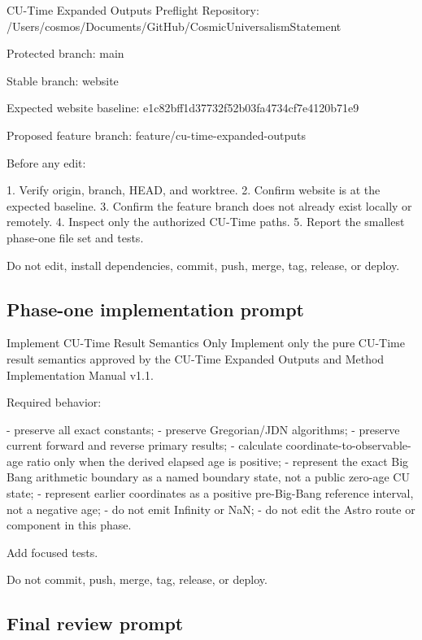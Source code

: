 \documentclass[11pt,letterpaper]{article}
\begin{document}
\begin{promptbox}{CU-Time Expanded Outputs Preflight}
Repository:
/Users/cosmos/Documents/GitHub/CosmicUniversalismStatement

Protected branch:
main

Stable branch:
website

Expected website baseline:
e1c82bff1d37732f52b03fa4734cf7e4120b71e9

Proposed feature branch:
feature/cu-time-expanded-outputs

Before any edit:

1. Verify origin, branch, HEAD, and worktree.
2. Confirm website is at the expected baseline.
3. Confirm the feature branch does not already exist locally or remotely.
4. Inspect only the authorized CU-Time paths.
5. Report the smallest phase-one file set and tests.

Do not edit, install dependencies, commit, push, merge, tag, release,
or deploy.
\end{promptbox}

\subsection{Phase-one implementation prompt}

\begin{promptbox}{Implement CU-Time Result Semantics Only}
Implement only the pure CU-Time result semantics approved by the
CU-Time Expanded Outputs and Method Implementation Manual v1.1.

Required behavior:

- preserve all exact constants;
- preserve Gregorian/JDN algorithms;
- preserve current forward and reverse primary results;
- calculate coordinate-to-observable-age ratio only when the derived
  elapsed age is positive;
- represent the exact Big Bang arithmetic boundary as a named boundary
  state, not a public zero-age CU state;
- represent earlier coordinates as a positive pre-Big-Bang reference
  interval, not a negative age;
- do not emit Infinity or NaN;
- do not edit the Astro route or component in this phase.

Add focused tests.

Do not commit, push, merge, tag, release, or deploy.
\end{promptbox}

\subsection{Final review prompt}
\end{document}
